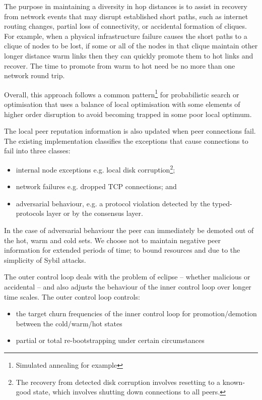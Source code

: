 \documentclass[11pt,a4paper]{article}
\begin{document}
The purpose in maintaining a diversity in hop distances is to assist in
recovery from network events that may disrupt established short paths,
such as internet routing changes, partial loss of connectivity, or
accidental formation of cliques. For example, when a physical
infrastructure failure causes the short paths to a clique of nodes to be
lost, if some or all of the nodes in that clique maintain other longer
distance warm links then they can quickly promote them to hot links and
recover. The time to promote from warm to hot need be no more than one
network round trip.

Overall, this approach follows a common pattern\footnote{Simulated
  annealing for example} for probabilistic search or optimisation that
uses a balance of local optimisation with some elements of higher order
disruption to avoid becoming trapped in some poor local optimum.

The local peer reputation information is also updated when peer
connections fail. The existing implementation classifies the exceptions
that cause connections to fail into three classes:

\begin{itemize}
\item
  internal node exceptions e.g. local disk corruption\footnote{The
    recovery from detected disk corruption involves resetting to a
    known-good state, which involves shutting down connections to all
    peers.};
\item
  network failures e.g. dropped TCP connections; and
\item
  adversarial behaviour, e.g. a protocol violation detected by the
  typed-protocols layer or by the consensus layer.
\end{itemize}

In the case of adversarial behaviour the peer can immediately be demoted
out of the hot, warm and cold sets. We choose not to maintain negative
peer information for extended periods of time; to bound resources and
due to the simplicity of Sybil attacks.

The outer control loop deals with the problem of eclipse -- whether
malicious or accidental -- and also adjusts the behaviour of the inner
control loop over longer time scales. The outer control loop controls:

\begin{itemize}
\item
  the target churn frequencies of the inner control loop for
  promotion/demotion between the cold/warm/hot states
\item
  partial or total re-bootstrapping under certain circumstances
\end{itemize}
\end{document}
